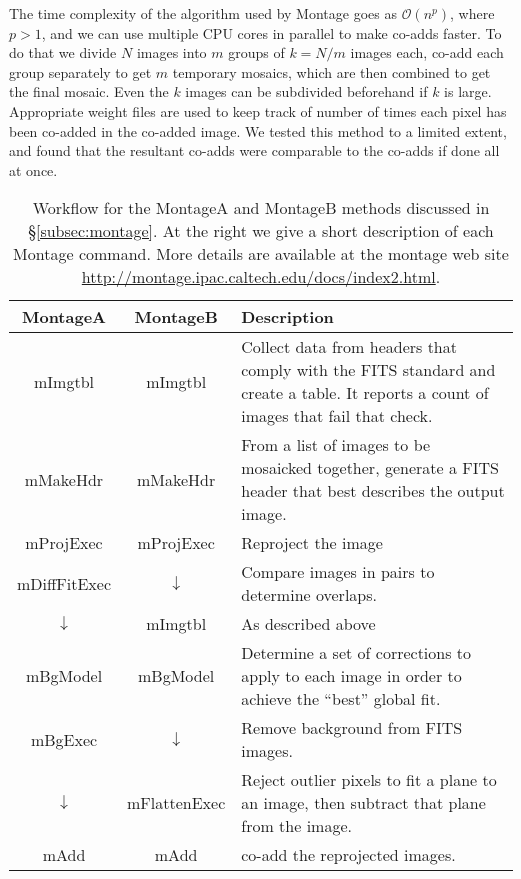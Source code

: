 \documentclass[fleqn,usenatbib]{mnras}
\begin{document}
The time complexity of the algorithm used by Montage goes as $\mathcal{O}(n^p)$, where $p>1$, and we can use multiple CPU cores in parallel to make co-adds faster. 
To do that we divide $N$ images into $m$ groups of $k = N/m$ images each, co-add each group separately to get $m$ temporary mosaics, which are then combined to get the final mosaic. Even the $k$ images can be subdivided beforehand if $k$ is large. Appropriate weight files are used to keep track of number of times each pixel has been co-added in the co-added image. We tested this method to a limited extent, and found that the resultant co-adds were comparable to the co-adds if done all at once.

\begin{table*}
\centering
\renewcommand{\arraystretch}{1.5}%
\begin{tabular}{c|c|p{8cm}}
\hline
MontageA & MontageB & Description\\
\hline
mImgtbl & mImgtbl & Collect data from headers that comply with the FITS standard and create a table. It reports a count of images that fail that check. \\
mMakeHdr & mMakeHdr & From a list of images to be mosaicked together, generate a FITS header that best describes the output image. \\
mProjExec & mProjExec & Reproject the image \\
mDiffFitExec & $\downarrow$  &  Compare images in pairs to determine overlaps.\\
$\downarrow$  & mImgtbl & As described above\\
mBgModel & mBgModel & Determine a set of corrections to apply to each image in order to achieve the ``best'' global fit.\\
mBgExec & $\downarrow$  & Remove background from FITS images.\\
$\downarrow$  & mFlattenExec & Reject outlier pixels to fit a plane to an image, then subtract that plane from the image. \\
mAdd & mAdd & co-add the reprojected images.\\
\hline
\end{tabular}
\caption{Workflow for the MontageA and MontageB methods discussed in \S\ref{subsec:montage}. At the right we give a short description of each Montage command. More details are available at the montage web site \url{http://montage.ipac.caltech.edu/docs/index2.html}.}
\label{tab:montagetypes}
\end{table*}
\end{document}
